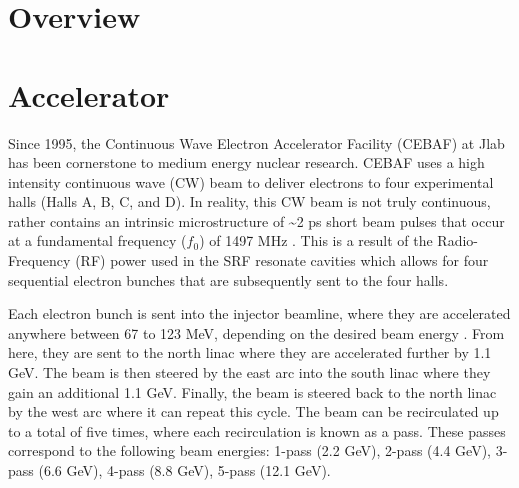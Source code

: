 \label{Chapter-4}

\hypertarget{Section-4.1}{%
\section{Overview}\label{Section-4.1}}

\hypertarget{Section-4.2}{%
\section{Accelerator}\label{Section-4.2}}

Since 1995, the Continuous Wave Electron Accelerator Facility (CEBAF) at
Jlab has been cornerstone to medium energy nuclear research. CEBAF uses
a high intensity continuous wave (CW) beam to deliver electrons to four
experimental halls (Halls A, B, C, and D). In reality, this CW beam is
not truly continuous, rather contains an intrinsic microstructure of
\textasciitilde2 ps short beam pulses that occur at a fundamental
frequency (\(f_0\)) of 1497 MHz \cite{reece_continuous_2016}. This is a
result of the Radio-Frequency (RF) power used in the SRF resonate
cavities which allows for four sequential electron bunches that are
subsequently sent to the four halls.



Each electron bunch is sent into the injector beamline, where they are
accelerated anywhere between 67 to 123 MeV, depending on the desired
beam energy \cite{pilat_12_2012}. From here, they are sent to the north
linac where they are accelerated further by 1.1 GeV. The beam is then
steered by the east arc into the south linac where they gain an
additional 1.1 GeV. Finally, the beam is steered back to the north linac
by the west arc where it can repeat this cycle. The beam can be
recirculated up to a total of five times, where each recirculation is
known as a pass. These passes correspond to the following beam energies:
1-pass (2.2 GeV), 2-pass (4.4 GeV), 3-pass (6.6 GeV), 4-pass (8.8 GeV),
5-pass (12.1 GeV).

